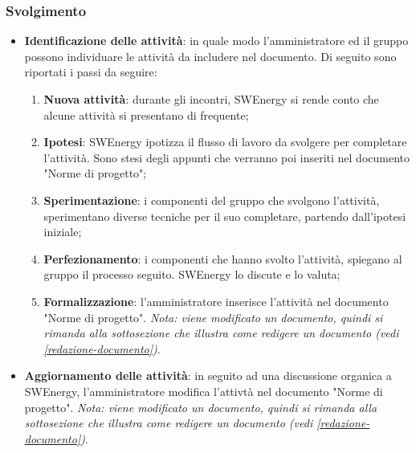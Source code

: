 \subsubsection{Svolgimento}
\begin{itemize}
	\item \textbf{Identificazione delle attività}: in quale modo
	      l'amministratore ed il gruppo possono individuare le attività da
	      includere nel documento. Di seguito sono riportati i passi da
	      seguire:
	      \begin{enumerate}
		      \item \textbf{Nuova attività}: durante gli incontri,
		            SWEnergy si rende conto che alcune attività si
		            presentano di frequente;

		      \item \textbf{Ipotesi}: SWEnergy ipotizza il flusso di lavoro da
		            svolgere per completare l'attività. Sono stesi degli appunti
		            che verranno poi inseriti nel documento "Norme di progetto";

		      \item \textbf{Sperimentazione}: i componenti del gruppo che
		            svolgono l'attività, sperimentano diverse tecniche per
		            il suo completare, partendo dall'ipotesi iniziale;

		      \item \textbf{Perfezionamento}: i componenti che hanno
		            svolto l'attività, spiegano al gruppo il processo
		            seguito. SWEnergy lo discute e lo valuta;

		      \item \textbf{Formalizzazione}: l'amministratore inserisce
		            l'attività nel documento "Norme di progetto". \textit{Nota:
		            viene modificato un documento, quindi si rimanda alla
		            sottosezione che illustra come redigere un documento
		            (vedi \cref{redazione-documento})}.
	      \end{enumerate}

	\item \textbf{Aggiornamento delle attività}: in seguito ad una discussione
	      organica a SWEnergy, l'amministratore modifica l'attivtà
	      nel documento "Norme di progetto". \textit{Nota:
	      viene modificato un documento, quindi si rimanda alla
	      sottosezione che illustra come redigere un documento
	      (vedi \cref{redazione-documento})}.
\end{itemize}
